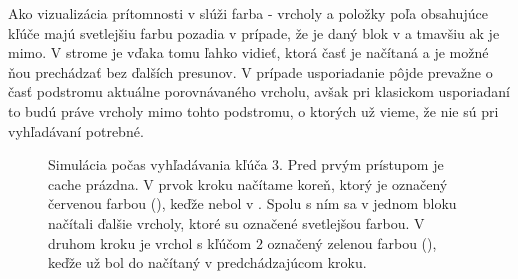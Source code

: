 Ako vizualizácia prítomnosti v \cache slúži farba - vrcholy a položky poľa obsahujúce kľúče majú svetlejšiu farbu pozadia v prípade, že je daný blok v \cache a tmavšiu ak je mimo. V strome je vďaka tomu ľahko vidieť, ktorá časť je načítaná a je možné ňou prechádzať bez ďalších presunov. V prípade \vEB usporiadanie pôjde prevažne o časť podstromu aktuálne porovnávaného vrcholu, avšak pri klasickom usporiadaní to budú práve vrcholy mimo tohto podstromu, o ktorých už vieme, že nie sú pri vyhľadávaní potrebné.

\begin{figure}
    \centering
    \hspace{1cm}
    \hspace{1cm}
    \caption{Simulácia \cache počas vyhľadávania kľúča $3$. Pred prvým prístupom je cache prázdna. V prvok kroku načítame koreň, ktorý je označený červenou farbou (\miss), keďže nebol v \cache. Spolu s ním sa v jednom bloku načítali ďalšie vrcholy, ktoré su označené svetlejšou farbou. V druhom kroku je vrchol s kľúčom $2$ označený zelenou farbou (\hit), keďže už bol do \cache načítaný v predchádzajúcom kroku.}
    \label{fig:ss_cachesim_colors}
\end{figure}

